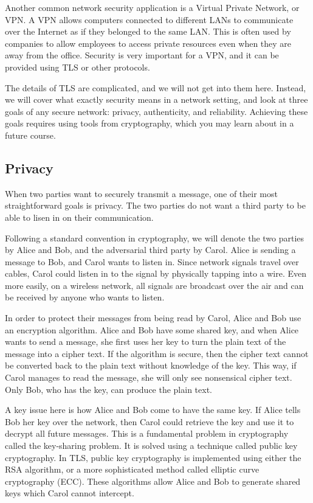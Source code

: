 Another common network security application is a Virtual Private Network, or VPN. A VPN allows computers connected to different LANs to communicate over the Internet as if they belonged to the same LAN. This is often used by companies to allow employees to access private resources even when they are away from the office. Security is very important for a VPN, and it can be provided using TLS or other protocols.

The details of TLS are complicated, and we will not get into them here. Instead, we will cover what exactly security means in a network setting, and look at three goals of any secure network: privacy, authenticity, and reliability. Achieving these goals requires using tools from cryptography, which you may learn about in a future course.

\subsection{Privacy}

When two parties want to securely transmit a message, one of their most straightforward goals is privacy. The two parties do not want a third party to be able to lisen in on their communication.

Following a standard convention in cryptography, we will denote the two parties by Alice and Bob, and the adversarial third party by Carol. Alice is sending a message to Bob, and Carol wants to listen in. Since network signals travel over cables, Carol could listen in to the signal by physically tapping into a wire. Even more easily, on a wireless network, all signals are broadcast over the air and can be received by anyone who wants to listen.

In order to protect their messages from being read by Carol, Alice and Bob use an encryption algorithm. Alice and Bob have some shared key, and when Alice wants to send a message, she first uses her key to turn the plain text of the message into a cipher text. If the algorithm is secure, then the cipher text cannot be converted back to the plain text without knowledge of the key. This way, if Carol manages to read the message, she will only see nonsensical cipher text. Only Bob, who has the key, can produce the plain text.

A key issue here is how Alice and Bob come to have the same key. If Alice tells Bob her key over the network, then Carol could retrieve the key and use it to decrypt all future messages. This is a fundamental problem in cryptography called the key-sharing problem. It is solved using a technique called public key cryptography. In TLS, public key cryptography is implemented using either the RSA algorithm, or a more sophisticated method called elliptic curve cryptography (ECC). These algorithms allow Alice and Bob to generate shared keys which Carol cannot intercept.

